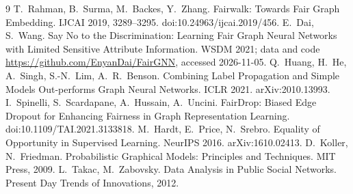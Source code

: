 \documentclass[11pt,a4paper]{article}
\begin{document}
\begin{thebibliography}{9}\small
{} T.~Rahman, B.~Surma, M.~Backes, Y.~Zhang. Fairwalk: Towards Fair Graph Embedding. IJCAI 2019, 3289--3295. doi:10.24963/ijcai.2019/456.
 E.~Dai, S.~Wang. Say No to the Discrimination: Learning Fair Graph Neural Networks with Limited Sensitive Attribute Information. WSDM 2021; data and code \url{https://github.com/EnyanDai/FairGNN}, accessed 2026-11-05.
 Q.~Huang, H.~He, A.~Singh, S.-N.~Lim, A.~R.~Benson. Combining Label Propagation and Simple Models Out-performs Graph Neural Networks. ICLR 2021. arXiv:2010.13993.
 I.~Spinelli, S.~Scardapane, A.~Hussain, A.~Uncini. FairDrop: Biased Edge Dropout for Enhancing Fairness in Graph Representation Learning. doi:10.1109/TAI.2021.3133818.
 M.~Hardt, E.~Price, N.~Srebro. Equality of Opportunity in Supervised Learning. NeurIPS 2016. arXiv:1610.02413.
 D.~Koller, N.~Friedman. Probabilistic Graphical Models: Principles and Techniques. MIT Press, 2009.
 L.~Takac, M.~Zabovsky. Data Analysis in Public Social Networks. Present Day Trends of Innovations, 2012.
\end{thebibliography}
\end{document}
